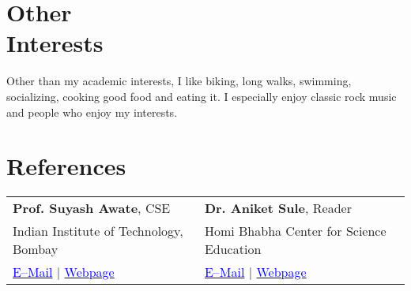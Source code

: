 \documentclass[margin,line]{res}
\begin{document}
\begin{resume}
\section{\sc Other \\Interests}
Other than my academic interests, I like biking, long walks, swimming, socializing, cooking good food and eating it. I especially enjoy classic rock music and people who enjoy my interests.

\section{\sc References} 
\begin{tabular}{@{}p{3in}p{3in}}
\textbf{Prof. Suyash Awate}, CSE & \textbf{Dr. Aniket Sule}, Reader \\ 
Indian Institute of Technology, Bombay & Homi Bhabha Center for Science Education \\
\href{mailto:suyash@cse.iitb.ac.in}{\textcolor{blue}{E--Mail}} $|$ \href{https://www.cse.iitb.ac.in/~suyash}{\textcolor{blue}{Webpage}} & \href{mailto:anikets@hbcse.tifr.res.in}{\textcolor{blue}{E--Mail}} $|$ \href{http://www.hbcse.tifr.res.in/people/academic/aniket-sule}{\textcolor{blue}{Webpage}}\\
\end{tabular}
\end{resume}
\end{document}
